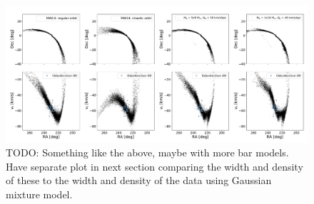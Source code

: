 \documentclass[twocolumn]{aastex62}
\newcommand{\todo}[1]{{\color{red} TODO: #1}}
\begin{document}
\begin{figure}
\centerline{\includegraphics[width=\textwidth]{simulations.pdf}}
\caption{\todo{Something like the above, maybe with more bar models. Have separate plot in next section comparing the width and density of these to the width and density of the data using Gaussian mixture model. }}
\label{fig:sims}
\end{figure}
\end{document}
